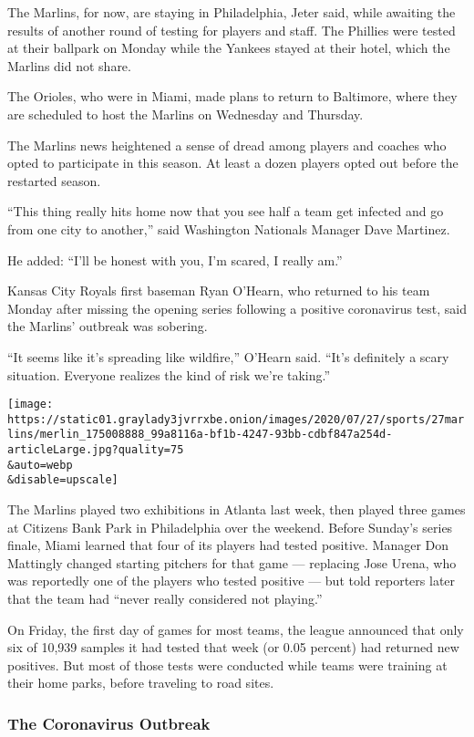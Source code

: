 The Marlins, for now, are staying in Philadelphia, Jeter said, while
awaiting the results of another round of testing for players and staff.
The Phillies were tested at their ballpark on Monday while the Yankees
stayed at their hotel, which the Marlins did not share.

The Orioles, who were in Miami, made plans to return to Baltimore, where
they are scheduled to host the Marlins on Wednesday and Thursday.

The Marlins news heightened a sense of dread among players and coaches
who opted to participate in this season. At least a dozen players opted
out before the restarted season.

``This thing really hits home now that you see half a team get infected
and go from one city to another,'' said Washington Nationals Manager
Dave Martinez.

He added: ``I'll be honest with you, I'm scared, I really am.''

Kansas City Royals first baseman Ryan O'Hearn, who returned to his team
Monday after missing the opening series following a positive coronavirus
test, said the Marlins' outbreak was sobering.

``It seems like it's spreading like wildfire,'' O'Hearn said. ``It's
definitely a scary situation. Everyone realizes the kind of risk we're
taking.''

\texttt{[image: https://static01.graylady3jvrrxbe.onion/images/2020/07/27/sports/27marlins/merlin\_175008888\_99a8116a-bf1b-4247-93bb-cdbf847a254d-articleLarge.jpg?quality=75\\\&auto=webp\\\&disable=upscale]}

The Marlins played two exhibitions in Atlanta last week, then played
three games at Citizens Bank Park in Philadelphia over the weekend.
Before Sunday's series finale, Miami learned that four of its players
had tested positive. Manager Don Mattingly changed starting pitchers for
that game --- replacing Jose Urena, who was reportedly one of the
players who tested positive --- but told reporters later that the team
had ``never really considered not playing.''

On Friday, the first day of games for most teams, the league announced
that only six of 10,939 samples it had tested that week (or 0.05
percent) had returned new positives. But most of those tests were
conducted while teams were training at their home parks, before
traveling to road sites.

\hypertarget{the-coronavirus-outbreak}{%
\subsubsection{The Coronavirus
Outbreak}\label{the-coronavirus-outbreak}}

